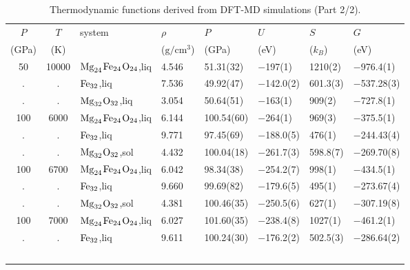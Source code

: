 \begin{table}[!h]
\centering

\caption{Thermodynamic functions derived from DFT-MD simulations (Part 2/2).}
\begin{adjustbox}{max width=\textwidth}
\begin{tabular}{ccllllll}
    \hline
 {$P$} & {$T$} & {system} &  {$\rho$} & 
 {$P$} & {$U$} & {$S$} &  {$G$}  \\
 {(GPa)} & {(K)} & &  {($\mathrm{g}/\mathrm{cm}^3$)} 
   & {(GPa)} & {(eV)} & {($k_B$)} & {(eV)} \\
   \hline
            50 &  10000 &  $\rm{Mg}_{24}$$\rm{Fe}_{24}$$\rm{O}_{24}$,liq &   4.546 &   51.31(32) &     $-$197(1) &    1210(2) &     $-$976.4(1) \\
             . &      . &                             $\rm{Fe}_{32}$,liq &   7.536 &   49.92(47) &   $-$142.0(2) &   601.3(3) &    $-$537.28(3) \\
             . &      . &                $\rm{Mg}_{32}$$\rm{O}_{32}$,liq &   3.054 &   50.64(51) &     $-$163(1) &     909(2) &     $-$727.8(1) \\
           100 &   6000 &  $\rm{Mg}_{24}$$\rm{Fe}_{24}$$\rm{O}_{24}$,liq &   6.144 &  100.54(60) &     $-$264(1) &     969(3) &     $-$375.5(1) \\
             . &      . &                             $\rm{Fe}_{32}$,liq &   9.771 &   97.45(69) &   $-$188.0(5) &     476(1) &    $-$244.43(4) \\
             . &      . &                $\rm{Mg}_{32}$$\rm{O}_{32}$,sol &   4.432 &  100.04(18) &   $-$261.7(3) &   598.8(7) &    $-$269.70(8) \\
           100 &   6700 &  $\rm{Mg}_{24}$$\rm{Fe}_{24}$$\rm{O}_{24}$,liq &   6.042 &   98.34(38) &   $-$254.2(7) &     998(1) &     $-$434.5(1) \\
             . &      . &                             $\rm{Fe}_{32}$,liq &   9.660 &   99.69(82) &   $-$179.6(5) &     495(1) &    $-$273.67(4) \\
             . &      . &                $\rm{Mg}_{32}$$\rm{O}_{32}$,sol &   4.381 &  100.46(35) &   $-$250.5(6) &     627(1) &    $-$307.19(8) \\
           100 &   7000 &  $\rm{Mg}_{24}$$\rm{Fe}_{24}$$\rm{O}_{24}$,liq &   6.027 &  101.60(35) &   $-$238.4(8) &    1027(1) &     $-$461.2(1) \\
             . &      . &                             $\rm{Fe}_{32}$,liq &   9.611 &  100.24(30) &   $-$176.2(2) &   502.5(3) &    $-$286.64(2) \\
$$
\end{tabular}
\end{adjustbox}
\end{table}
